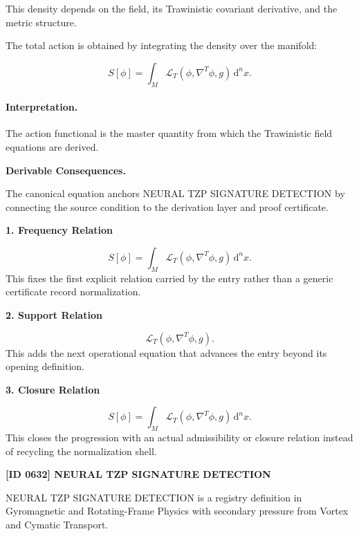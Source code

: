 This density depends on the field, its Trawinistic covariant derivative, and the metric structure.

The total action is obtained by integrating the density over the manifold:

\begin{equation}
\boxed{
S[\phi]
=
\int_M
\mathcal{L}_T
\left(
\phi,\nabla^T\phi,g
\right)
\,\mathrm{d}^n x .
}
\end{equation}

\paragraph{Interpretation.}
The action functional is the master quantity from which the Trawinistic field equations are derived.

\par\vspace{0.35em}
\noindent\textbf{Derivable Consequences.}\quad
\begingroup
\footnotesize
\raggedright
The canonical equation anchors NEURAL TZP SIGNATURE DETECTION by connecting the source condition to the derivation layer and proof certificate.
\par\endgroup

\noindent\textbf{1. Frequency Relation}\par
\[
S[\phi] = \int_M \mathcal{L}_T \left( \phi,\nabla^T\phi,g \right) \,\mathrm{d}^n x.
\]
\noindent This fixes the first explicit relation carried by the entry rather than a generic certificate record normalization.\par
\noindent\textbf{2. Support Relation}\par
\[
\mathcal{L}_T \left( \phi,\nabla^T\phi,g \right).
\]
\noindent This adds the next operational equation that advances the entry beyond its opening definition.\par
\noindent\textbf{3. Closure Relation}\par
\[
\boxed{ S[\phi] = \int_M \mathcal{L}_T \left( \phi,\nabla^T\phi,g \right) \,\mathrm{d}^n x. }
\]
\noindent This closes the progression with an actual admissibility or closure relation instead of recycling the normalization shell.\par

\clearpage
\noindent\textbf{[ID 0632] NEURAL TZP SIGNATURE DETECTION}\par
\vspace{0.35em}
\begingroup\small
{}
NEURAL TZP SIGNATURE DETECTION is a registry definition in Gyromagnetic and Rotating-Frame Physics with secondary pressure from Vortex and Cymatic Transport.

